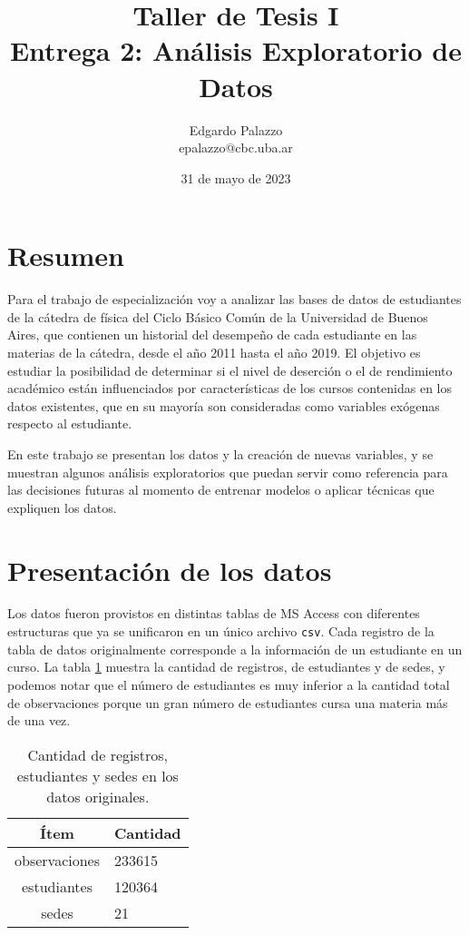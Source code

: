 \documentclass[a4paper,11pt,dvipsnames]{article}
\title{Taller de Tesis I\\
Entrega 2: Análisis Exploratorio de Datos}
\author{\large Edgardo Palazzo\\ \normalsize epalazzo@cbc.uba.ar}
\date{31 de mayo de 2023}
\begin{document}
\maketitle
\thispagestyle{fancy}

\section*{Resumen}

Para el trabajo de especialización voy a analizar las bases de datos de estudiantes de la cátedra de física del Ciclo Básico Común de la Universidad de Buenos Aires, que contienen un historial del desempeño de cada estudiante en las materias de la cátedra, desde el año 2011 hasta el año 2019. El objetivo es estudiar la posibilidad de determinar si el nivel de deserción o el de rendimiento académico están influenciados por características de los cursos contenidas en los datos existentes, que en su mayoría son consideradas como variables exógenas respecto al estudiante.\par\medskip
En este trabajo se presentan los datos y la creación de nuevas variables, y se muestran algunos análisis exploratorios que puedan servir como referencia para las decisiones futuras al momento de entrenar modelos o aplicar técnicas que expliquen los datos.

\section{Presentación de los datos}

Los datos fueron provistos en distintas tablas de MS Access con diferentes estructuras que ya se unificaron en un único archivo \texttt{csv}. Cada registro de la tabla de datos originalmente corresponde a la información de un estudiante en un curso. La tabla \ref{tab:tamanio} muestra la cantidad de registros, de estudiantes y de sedes, y podemos notar que el número de estudiantes es muy inferior a la cantidad total de observaciones porque un gran número de estudiantes cursa una materia más de una vez.\par\medskip

\begin{table}[!hb]
    \caption{Cantidad de registros, estudiantes y sedes en los datos originales.}
    \begin{center}
    \begin{tabular}{cl}
    \hline
    \textbf{Ítem} & \textbf{Cantidad}\\
    \hline
    observaciones & 233615\\
    estudiantes & 120364\\
    sedes & 21\\
    \hline
    \end{tabular}
    \label{tab:tamanio}
    \end{center}
\end{table}
\end{document}

